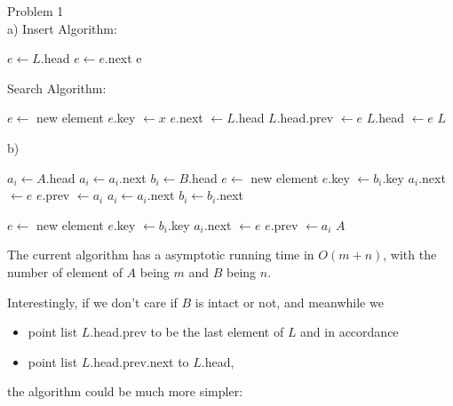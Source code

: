\documentclass{article}
\begin{document}
Problem 1\\

a)
Insert Algorithm:
\begin{algorithmic}[1]
    \State $e \gets L$.head
        \State $e \gets e$.next
    \EndWhile
    \State \Return e
\EndFunction
\end{algorithmic}

Search Algorithm:
\begin{algorithmic}[1]
        \State $e \gets$ new element
        \State $e$.key $\gets x$
        \State $e$.next $\gets L$.head
        \State $L$.head.prev $\gets e$
        \State $L$.head $\gets e$
        \State \Return $L$
    \EndFunction
\end{algorithmic}

b)
\begin{algorithmic}[1]
        \State $a_i \gets A$.head
        \State $a_i \gets a_i$.next
        \EndWhile
        \State $b_i \gets B$.head
            \State $e \gets$ new element
            \State $e$.key $\gets b_i$.key
            \State $a_i$.next $\gets e$
            \State $e$.prev $\gets a_i$
            \State $a_i \gets a_i.$next
            \State $b_i \gets b_i$.next
        \EndWhile

        \State $e \gets$ new element
        \State $e$.key $\gets b_i$.key
        \State $a_i$.next $\gets e$
        \State $e$.prev $\gets a_i$
        \State \Return $A$
    \EndFunction
\end{algorithmic}

The current algorithm has a asymptotic running time in $O(m + n)$, with the
number of element of $A$ being $m$ and $B$ being $n$.

Interestingly, if we don't care if $B$ is intact or not, and meanwhile we
\begin{itemize}
    \item point list $L$.head.prev to be the last element of $L$ and in accordance
    \item point list $L$.head.prev.next to $L$.head,
\end{itemize}
the algorithm could be much more simpler:
\end{document}
